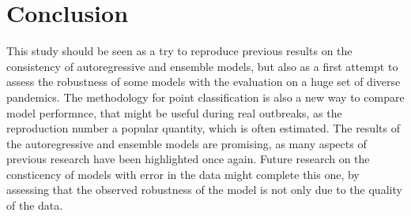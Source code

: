 \section*{Conclusion}


This study should be seen as a try to reproduce previous results on the consistency of autoregressive and ensemble models, but also as a first attempt to assess the robustness of some models with the evaluation on a huge set of diverse pandemics. 
The methodology for point classification is also a new way to compare model performnce, that might be useful during real outbreaks, as the reproduction number a popular quantity, which is often estimated. 
The results of the autoregressive and ensemble models are promising, as many aspects of previous research have been highlighted once again.
Future research on the consticency of models with error in the data might complete this one, by assessing that the observed robustness of the model is not only due to the quality of the data.